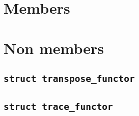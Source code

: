 \documentclass[oneside]{book}
\begin{document}
\section{Members}

\section{Non members}
\subsection{\texttt{struct transpose\_functor}}
\subsection{\texttt{struct trace\_functor}}
\end{document}
